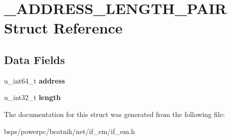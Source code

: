 \hypertarget{struct__ADDRESS__LENGTH__PAIR}{}\section{\+\_\+\+A\+D\+D\+R\+E\+S\+S\+\_\+\+L\+E\+N\+G\+T\+H\+\_\+\+P\+A\+IR Struct Reference}
\label{struct__ADDRESS__LENGTH__PAIR}
\subsection*{Data Fields}
\begin{DoxyCompactItemize}
\item 
\mbox{\label{struct__ADDRESS__LENGTH__PAIR_a011a9081d22a43f8bd6e6b865fe4410e}} 
u\+\_\+int64\+\_\+t {\bfseries address}
\item 
\mbox{\label{struct__ADDRESS__LENGTH__PAIR_aea99e296811744f1b470c6cd2ba759f0}} 
u\+\_\+int32\+\_\+t {\bfseries length}
\end{DoxyCompactItemize}


The documentation for this struct was generated from the following file\+:\begin{DoxyCompactItemize}
\item 
bsps/powerpc/beatnik/net/if\+\_\+em/if\+\_\+em.\+h\end{DoxyCompactItemize}
